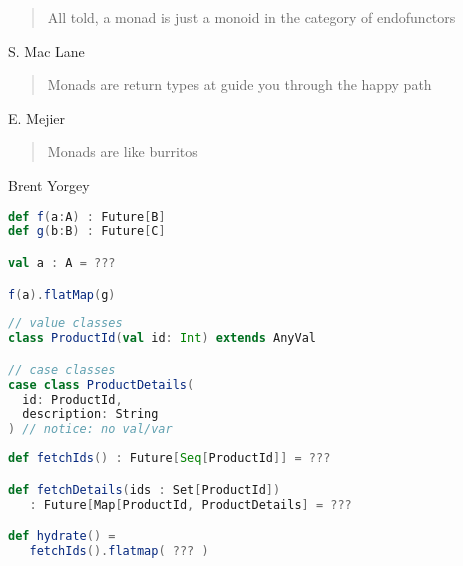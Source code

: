 \documentclass[10pt]{beamer}
\begin{document}
\begin{frame}[fragile]
\begin{quotation}
All told, a monad is just a monoid in the category of endofunctors 
\end{quotation}
\begin{flushright}
S. Mac Lane
\end{flushright}
\begin{quotation}
Monads are return types at guide you through the happy path 
\end{quotation}
\begin{flushright}
E. Mejier 
\end{flushright}
\begin{quotation}
Monads are like burritos 
\end{quotation}
\begin{flushright}
Brent Yorgey
\end{flushright}
\end{frame}

\begin{frame}[fragile]
\begin{lstlisting}[language=Scala, basicstyle=\ttfamily]
def f(a:A) : Future[B]
def g(b:B) : Future[C]

val a : A = ???

f(a).flatMap(g)
\end{lstlisting}
\end{frame}
\begin{frame}[fragile]
\begin{lstlisting}[language=Scala, basicstyle=\ttfamily]
// value classes 
class ProductId(val id: Int) extends AnyVal 

// case classes 
case class ProductDetails(
  id: ProductId,
  description: String
) // notice: no val/var 
\end{lstlisting}
\end{frame}


\begin{frame}[fragile]
\begin{lstlisting}[language=Scala, basicstyle=\ttfamily]
def fetchIds() : Future[Seq[ProductId]] = ???

def fetchDetails(ids : Set[ProductId]) 
   : Future[Map[ProductId, ProductDetails] = ???

def hydrate() = 
   fetchIds().flatmap( ??? )

\end{lstlisting}
\end{frame}
\end{document}
